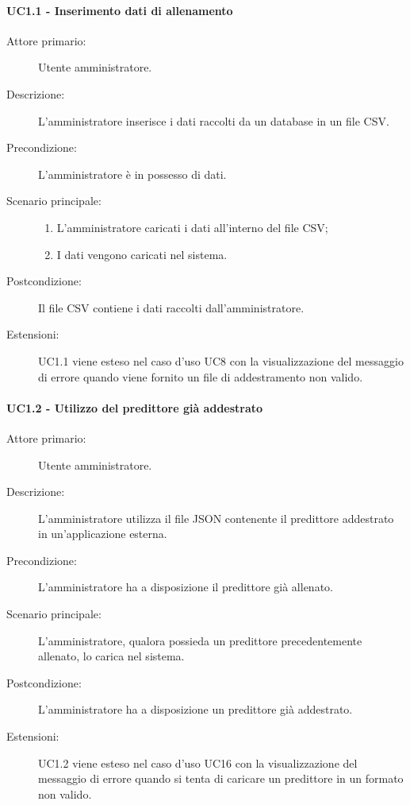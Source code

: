 \paragraph{UC1.1 - Inserimento dati di allenamento}
\label{sssec:uc1.1}
\begin{description}
  \item[Attore primario:] Utente amministratore.
  \item[Descrizione:] L'amministratore inserisce i dati raccolti da un database in un file CSV.
  \item[Precondizione:] L'amministratore è in possesso di dati.
  \item[Scenario principale:]
  \begin{enumerate}
    \item L'amministratore caricati i dati all'interno del file CSV;
    \item I dati vengono caricati nel sistema.
  \end{enumerate}
  \item[Postcondizione:] Il file CSV contiene i dati raccolti dall'amministratore.
  \item[Estensioni:] UC1.1 viene esteso nel caso d'uso UC8 con la visualizzazione del messaggio di errore quando viene fornito un file di addestramento non valido.
\end{description}

\paragraph{UC1.2 - Utilizzo del predittore già addestrato}
\label{sssec:uc1.2}
\begin{description}
  \item[Attore primario:] Utente amministratore.
  \item[Descrizione:] L'amministratore utilizza il file JSON contenente il predittore addestrato in un'applicazione esterna.
  \item[Precondizione:] L'amministratore ha a disposizione il predittore già allenato.
  \item[Scenario principale:] L'amministratore, qualora possieda un predittore precedentemente allenato, lo carica nel sistema.
  \item[Postcondizione:] L'amministratore ha a disposizione un predittore già addestrato.
  \item[Estensioni:] UC1.2 viene esteso nel caso d'uso UC16 con la visualizzazione del messaggio di errore quando si tenta di caricare un predittore in un formato non valido.
\end{description}

